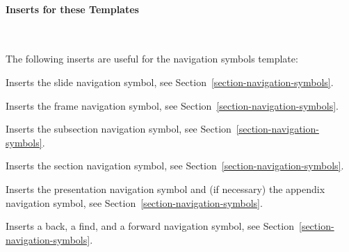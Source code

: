 \paragraph{Inserts for these Templates}\ 

The following inserts are useful for the navigation symbols template:

\begin{command}{\insertslidenavigationsymbol}
  Inserts the slide navigation symbol, see
  Section~\ref{section-navigation-symbols}.
\end{command}

\begin{command}{\insertframenavigationsymbol}
  Inserts the frame navigation symbol, see
  Section~\ref{section-navigation-symbols}.
\end{command}

\begin{command}{\insertsubsectionnavigationsymbol}
  Inserts the subsection navigation symbol, see
  Section~\ref{section-navigation-symbols}.
\end{command}

\begin{command}{\insertsectionnavigationsymbol}
  Inserts the section navigation symbol, see
  Section~\ref{section-navigation-symbols}.
\end{command}

\begin{command}{\insertdocnavigationsymbol}
  Inserts the presentation navigation symbol and (if necessary) the
  appendix navigation symbol, see
  Section~\ref{section-navigation-symbols}.
\end{command}

\begin{command}{\insertbackfindforwardnavigationsymbol}
  Inserts a back, a find, and a forward navigation symbol, see
  Section~\ref{section-navigation-symbols}.
\end{command}








